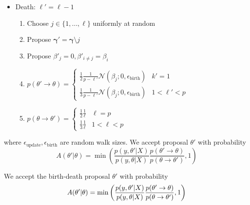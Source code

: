 \documentclass{article}
\begin{document}
\begin{itemize}
    \item Death: $\ell' = \ell-1$
    \begin{enumerate}
        \item Choose $j \in \{1, \ldots, \ell\}$ uniformly at random
        \item Propose $\mathbf{\gamma}' = \mathbf{\gamma} \setminus j$ 
        \item Propose $\beta'_{j} = 0, \beta'_{i \neq j} = \beta_{i}$
        \item $p(\theta' \rightarrow \theta) = \begin{cases}\frac{1}{2}\frac{1}{p-\ell'} \mathcal{N}(\beta_{j}; 0,\epsilon_{\text{birth}}) & k'=1 \\ \frac{1}{3} \frac{1}{p-\ell'} \mathcal{N}(\beta_{j}; 0,\epsilon_{\text{birth}}) & 1<\ell'<p \end{cases} $
        \item $p(\theta \rightarrow \theta') = \begin{cases}\frac{1}{2}\frac{1}{\ell} & \ell=p \\ \frac{1}{3} \frac{1}{\ell} & 1<\ell<p \end{cases} $
    \end{enumerate}
\end{itemize}
where $\epsilon_{\text{update}}, \epsilon_{\text{birth}}$ are random walk sizes. We accept proposal $\theta'$ with probability $$A(\theta'|\theta) = \min{\left(\frac{p(y, \theta' | X )}{p(y, \theta | X )} \frac{p(\theta' \rightarrow \theta)}{p(\theta \rightarrow \theta')}, 1\right)}$$

We accept the birth-death proposal $\theta'$ with probability 
\begin{equation}
    A(\theta'|\theta) = \min{\left(\frac{p(y, \theta' | X )}{p(y, \theta | X )} \frac{p(\theta' \rightarrow \theta)}{p(\theta \rightarrow \theta')}, 1\right)} \\
\end{equation}

\end{document}

